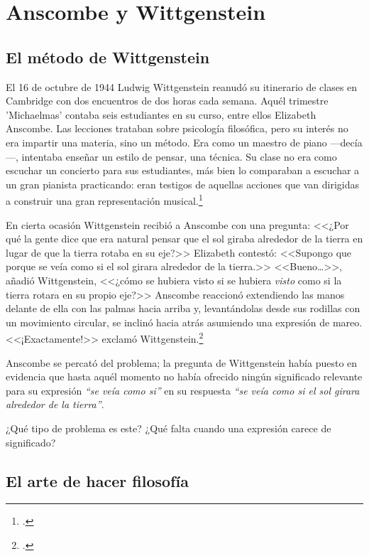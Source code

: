 \section{Anscombe y Wittgenstein}

\subsection{El método de Wittgenstein}
El 16 de octubre de 1944 Ludwig Wittgenstein reanudó su itinerario de clases en
Cambridge con dos encuentros de dos horas cada semana. Aquél trimestre
'Michaelmas' contaba seis estudiantes en su curso, entre ellos Elizabeth
Anscombe. Las lecciones trataban sobre psicología filosófica, pero su interés no
era impartir una materia, sino un método. Era como un maestro de piano
---decía---, intentaba enseñar un estilo de pensar, una técnica. Su clase no era
como escuchar un concierto para sus estudiantes, más bien lo comparaban a
escuchar a un gran pianista practicando: eran testigos de aquellas acciones que
van dirigidas a construir una gran representación
musical.\footcite[p.~357]{pubnpriv}
 
En cierta ocasión Wittgenstein recibió a Anscombe con una pregunta: <<¿Por qué la
gente dice que era natural pensar que el sol giraba alrededor de la tierra en
lugar de que la tierra rotaba en su eje?>> Elizabeth contestó: <<Supongo que
porque se veía como si el sol girara alrededor de la tierra.>> <<Bueno\ldots>>,
añadió Wittgenstein, <<¿cómo se hubiera visto si se hubiera \emph{visto} como si
la tierra rotara en su propio eje?>> Anscombe reaccionó extendiendo las manos
delante de ella con las palmas hacia arriba y, levantándolas desde sus rodillas
con un movimiento circular, se inclinó hacia atrás asumiendo una expresión de
mareo. <<¡Exactamente!>> exclamó Wittgenstein.\footcite[cf.~][p.~151]{IWT}

Anscombe se percató del problema; la pregunta de Wittgenstein había puesto en
evidencia que hasta aquél momento no había ofrecido ningún significado relevante
para su expresión \emph{``se veía como si''} en su respuesta \emph{``se veía
    como si el sol girara alrededor de la tierra''}. 
 
¿Qué tipo de problema es este? 
¿Qué falta cuando una expresión carece de significado?

\subsection{El arte de hacer filosofía}


